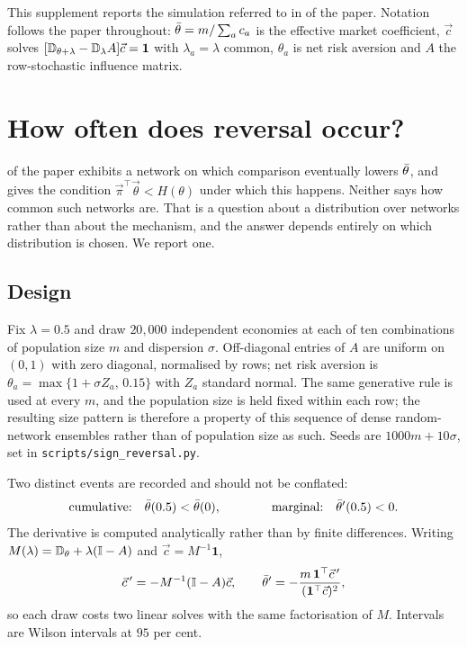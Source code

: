 \noindent
This supplement reports the simulation referred to in  of the paper.
Notation follows the paper throughout: $\bar\theta=m/\sum_ac_a$ is the effective
market coefficient, $\vec c$ solves
$[\mathbb{D}_{\theta+\lambda}-\mathbb{D}_{\lambda}A]\vec c=\mathbf 1$ with $\lambda_a=\lambda$
common, $\theta_a$ is net risk aversion and $A$ the row-stochastic influence
matrix.

\section{How often does reversal occur?}

 of the paper exhibits a network on which comparison eventually
lowers $\bar\theta$, and  gives the condition
$\vec\pi^{\top}\vec\theta<H(\theta)$ under which this happens. Neither says how
common such networks are. That is a question about a distribution over networks
rather than about the mechanism, and the answer depends entirely on which
distribution is chosen. We report one.

\subsection*{Design}

Fix $\lambda=0.5$ and draw $20{,}000$ independent economies at each of ten
combinations of population size $m$ and dispersion $\sigma$. Off-diagonal
entries of $A$ are uniform on $(0,1)$ with zero diagonal, normalised by rows;
net risk aversion is $\theta_a=\max\{1+\sigma Z_a,\,0.15\}$ with $Z_a$ standard
normal. The same generative rule is used at every $m$, and the population size
is held fixed within each row; the resulting size pattern is therefore a
property of this sequence of dense random-network ensembles rather than of
population size as such. Seeds are $1000m+10\sigma$, set in \texttt{scripts/sign\_reversal.py}.

Two distinct events are recorded and should not be conflated:
%
\begin{equation}
\text{cumulative:}\quad \bar\theta(0.5)<\bar\theta(0),
\qquad\qquad
\text{marginal:}\quad \bar\theta'(0.5)<0 .
\label{eq:events}
\end{equation}
%
The derivative is computed analytically rather than by finite differences.
Writing $M(\lambda)=\mathbb{D}_{\theta}+\lambda(\mathbb{I}-A)$ and $\vec c=M^{-1}\mathbf 1$,
%
\begin{equation}
\vec c\,'=-M^{-1}(\mathbb{I}-A)\vec c,
\qquad
\bar\theta'=-\frac{m\,\mathbf 1^{\top}\vec c\,'}{(\mathbf 1^{\top}\vec c)^{2}} ,
\label{eq:deriv-num}
\end{equation}
%
so each draw costs two linear solves with the same factorisation of $M$.
Intervals are Wilson intervals at $95$ per cent.

